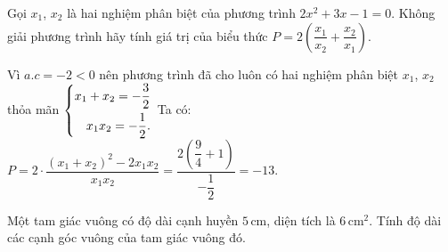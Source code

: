 \begin{ex}%
   Gọi $x_1$, $x_2$ là hai nghiệm phân biệt của phương trình $2x^2+3x-1=0$. Không giải phương trình hãy tính giá trị của biểu thức $P=2\left(\dfrac{x_1}{x_2}+\dfrac{x_2}{x_1}\right)$.
   \loigiai
  {Vì $a.c=-2<0$ nên phương trình đã cho luôn có hai nghiệm phân biệt $x_1$, $x_2$ thỏa mãn $\left\{\begin{aligned}x_1+x_2=-\dfrac{3}{2}\\ x_1x_2=-\dfrac{1}{2}.\end{aligned}\right.$ Ta có: $P=2\cdot\dfrac{(x_1+x_2)^2-2x_1x_2}{x_1x_2}=\dfrac{2\left(\dfrac{9}{4}+1\right)}{-\dfrac{1}{2}}=-13.$
    
}
\end{ex}
\begin{ex}%
	Một tam giác vuông có độ dài cạnh huyền $5\mathrm{\,cm}$, diện tích là $6\mathrm{\,cm}^2$. Tính độ dài các cạnh góc vuông của tam giác vuông đó.
	\loigiai
	{}
\end{ex}
